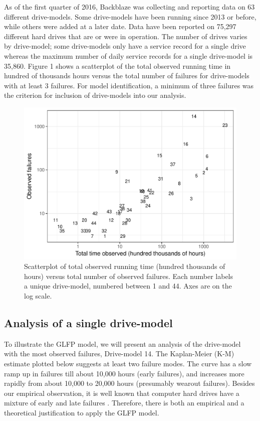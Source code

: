 \documentclass[12pt]{article}
\begin{document}
As of the first quarter of 2016, Backblaze was collecting and reporting data on 63 different drive-models.  Some drive-models have been running since 2013 or before, while others were added at a later date.  Data have been reported on 75,297 different hard drives that are or were in operation.  The number of drives varies by drive-model; some drive-models only have a service record for a single drive whereas the maximum number of daily service records for a single drive-model is 35,860.  Figure 1 shows a scatterplot of the total observed running time in hundred of thousands hours versus the total number of failures for drive-models with at least 3 failures.  For model identification, a minimum of three failures was the criterion for inclusion of drive-models into our analysis.  

\begin{figure}[H]
  \includegraphics[width=.9\textwidth]{dm-summ-scatter.pdf}
  \caption{Scatterplot of total observed running time (hundred thousands of hours) versus total number of observed failures.  Each number labels a unique drive-model, numbered between 1 and 44.   Axes are on the log scale.}
  \label{drive-scatter}
\end{figure}

\subsection{Analysis of a single drive-model}
\label{subsec:ex1}
To illustrate the GLFP model, we will present an analysis of the drive-model with the most observed failures, Drive-model 14.  The Kaplan-Meier (K-M) estimate plotted below suggests at least two failure modes.  The curve has a slow ramp up in failures till about 10,000 hours (early failures), and increases more rapidly from about 10,000 to 20,000 hours (presumably wearout failures).  Besides our empirical observation, it is well known that computer hard drives have a mixture of early and late failures \citep{chan}.  Therefore, there is both an empirical and a theoretical justification to apply the GLFP model.
\end{document}
